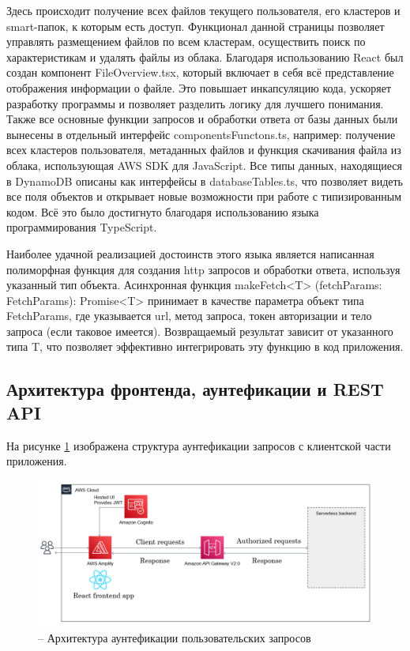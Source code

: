 Здесь происходит получение всех файлов текущего пользователя, его кластеров и smart-папок, к которым есть доступ. Функционал данной страницы позволяет управлять размещением файлов по всем кластерам, осуществить поиск по характеристикам и удалять файлы из облака.
Благодаря использованию React был создан компонент FileOverview.tsx, который включает в себя всё представление отображения информации о файле. Это повышает инкапсуляцию кода, ускоряет разработку программы и позволяет разделить логику для лучшего понимания.
Также все основные функции запросов и обработки ответа от базы данных были вынесены в отдельный интерфейс componentsFunctons.ts, например: получение всех кластеров пользователя, метаданных файлов и функция скачивания файла из облака, использующая AWS SDK для JavaScript. Все типы данных, находящиеся в DynamoDB описаны как интерфейсы в databaseTables.ts, что позволяет видеть все поля объектов и открывает новые возможности при работе с типизированным кодом. Всё это было достигнуто благодаря использованию языка программирования TypeScript.

Наиболее удачной реализацией достоинств этого языка является написанная полиморфная функция для создания http запросов и обработки ответа, используя указанный тип объекта. Асинхронная функция makeFetch<T>
(fetchParams: FetchParams): Promise<T> принимает в качестве параметра объект типа FetchParams, где указывается url, метод запроса, токен авторизации и тело запроса (если таковое имеется). Возвращаемый результат зависит от указанного типа T, что позволяет эффективно интегрировать эту функцию в код приложения.

\subsection{Архитектура фронтенда, аунтефикации и REST API}
На рисунке \ref{authentication} изображена структура аунтефикации запросов с клиентской части приложения.
\begin{figure}[H]
    \centering
    \includegraphics[scale=0.65]{images/Authentication.png}
    \caption{ -- Архитектура аунтефикации пользовательских запросов}
    \label{authentication}
\end{figure}

